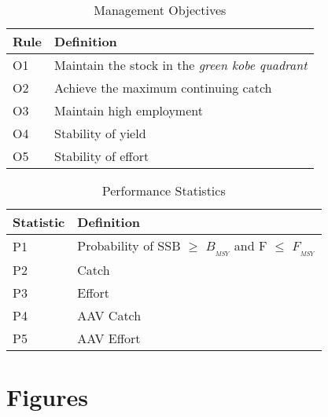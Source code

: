 \documentclass[%
nonumbib,      %
%
]{nrc1}                          %
\begin{document}
\begin{table}[h!]
  \begin{center}
    \begin{tabular}{ l p{10cm} }
    \hline
    Rule & Definition \\
    \hline 
     O1   & Maintain the stock in the \emph{green kobe quadrant}\\
     O2   & Achieve the maximum continuing catch \\
     O3   & Maintain high employment \\
     O4   & Stability of yield \\
     O5   & Stability of effort \\
     \hline
    \end{tabular}
  \end{center}
  \label{tab:objectives}
  \caption{Management Objectives}  
\end{table}

\begin{table}[h!]
  \begin{center}
    \begin{tabular}{ l p{10cm} }
    \hline 
    Statistic & Definition \\ 
    \hline 
    P1   & Probability of SSB $\geq$ $B_{_{MSY}}$ and F $\le$  $F_{_{MSY}}$ \\ 
    P2   & Catch\\ 
    P3   & Effort\\ 
    P4   & AAV Catch  \\ 
    P5   & AAV Effort  \\ 
    \hline 
    \end{tabular}
  \end{center}
  \label{tab:measures}
  \caption{Performance Statistics}  
\end{table}


\newpage\clearpage
\section*{Figures}
\end{document}
